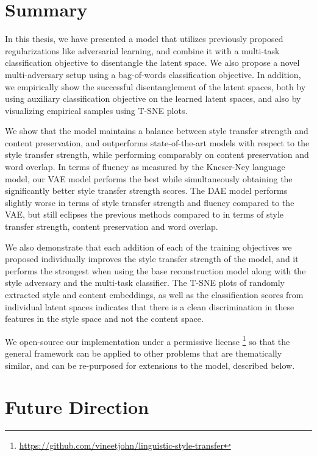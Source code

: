 \section{Summary}

In this thesis, we have presented a model that utilizes previously proposed regularizations like adversarial learning, and combine it with a multi-task classification objective to disentangle the latent space. We also propose a novel multi-adversary setup using a bag-of-words classification objective. In addition,  we empirically show the successful disentanglement of the latent spaces, both by using auxiliary classification objective on the learned latent spaces, and also by visualizing empirical samples using T-SNE plots.

We show that the model maintains a balance between style transfer strength and content preservation, and outperforms state-of-the-art models with respect to the style transfer strength, while performing comparably on content preservation and word overlap. In terms of fluency as measured by the Kneser-Ney language model, our VAE model performs the best while simultaneously obtaining the significantly better style transfer strength scores. The DAE model performs slightly worse in terms of style transfer strength and fluency compared to the VAE, but still eclipses the previous methods compared to in terms of style transfer strength, content preservation and word overlap.

We also demonstrate that each addition of each of the training objectives we proposed individually improves the style transfer strength of the model, and it performs the strongest when using the base reconstruction model along with the style adversary and the multi-task classifier. The T-SNE plots of randomly extracted style and content embeddings, as well as the classification scores from individual latent spaces indicates that there is a clean discrimination in these features in the style space and not the content space.

We open-source our implementation under a permissive license \footnote{\url{https://github.com/vineetjohn/linguistic-style-transfer}} so that the general framework can be applied to other problems that are thematically similar, and can be re-purposed for extensions to the model, described below.


\section{Future Direction}


